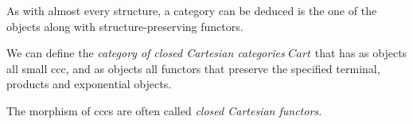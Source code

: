 As with almost every structure, a category can be deduced is the one of the objects along with structure-preserving functors.

\begin{definition}
  We can define the \emph{category of closed Cartesian categories} $Cart$ that has as objects all small ccc, and as objects all functors that preserve the specified terminal, products and exponential objects.
\end{definition}

The morphism of cccs are often called \emph{closed Cartesian functors.}
